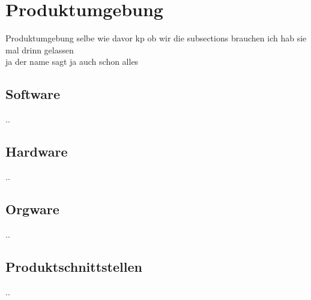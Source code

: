 \chapter{Produktumgebung}
Produktumgebung selbe wie davor kp ob wir die subsections brauchen ich hab sie
mal drinn gelassen\\

ja der name sagt ja auch schon alles

\section{Software}
..
\section{Hardware}
..
\section{Orgware}
..
\section{Produktschnittstellen}
..